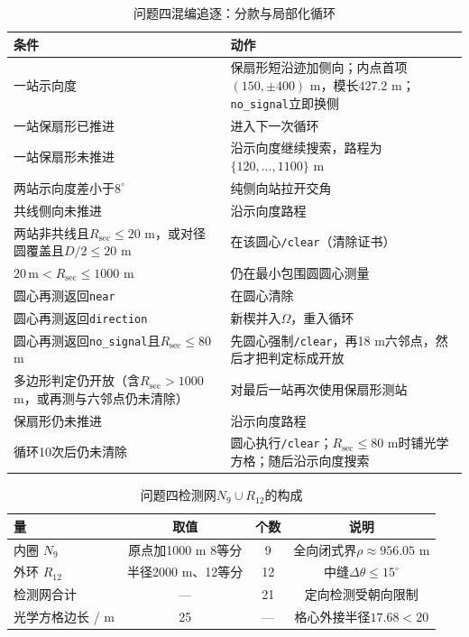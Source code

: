 \documentclass{cumcmthesis}
\begin{document}
\begin{table}[htbp]
\centering
\caption{问题四混编追逐：分款与局部化循环}
\label{tab:q4chase}
\begin{tabular}{>{\raggedright\arraybackslash}p{}>{\raggedright\arraybackslash}p{}}
\toprule
条件 & 动作 \\
\midrule
一站示向度 & 保扇形短沿迹加侧向；内点首项$(150,\pm 400)$ m，模长$427.2$ m；\texttt{no\_signal}立即换侧 \\
一站保扇形已推进 & 进入下一次循环 \\
一站保扇形未推进 & 沿示向度继续搜索，路程为$\{120,\ldots,1100\}$ m \\
两站示向度差小于$8^\circ$ & 纯侧向站拉开交角 \\
共线侧向未推进 & 沿示向度路程 \\
两站非共线且$R_{\mathrm{sec}}\le 20$ m，或对径圆覆盖且$D/2\le 20$ m & 在该圆心\texttt{/clear}（清除证书） \\
$20\,\mathrm{m}<R_{\mathrm{sec}}\le 1000$ m & 仍在最小包围圆圆心测量 \\
圆心再测返回\texttt{near} & 在圆心清除 \\
圆心再测返回\texttt{direction} & 新楔并入$\Omega$，重入循环 \\
圆心再测返回\texttt{no\_signal}且$R_{\mathrm{sec}}\le 80$ m & 先圆心强制\texttt{/clear}，再18 m六邻点，然后才把判定标成开放 \\
多边形判定仍开放（含$R_{\mathrm{sec}}>1000$ m，或再测与六邻点仍未清除） & 对最后一站再次使用保扇形测站 \\
保扇形仍未推进 & 沿示向度路程 \\
循环10次后仍未清除 & 圆心执行\texttt{/clear}；$R_{\mathrm{sec}}\le 80$ m时铺光学方格；随后沿示向度搜索 \\
\bottomrule
\end{tabular}
\end{table}

\begin{table}[htbp]
\centering
\caption{问题四检测网$N_9\cup R_{12}$的构成}
\label{tab:q4pts}
\begin{tabular}{lccc}
\toprule
量 & 取值 & 个数 & 说明 \\
\midrule
内圈 $N_9$ & 原点加1000 m 8等分 & 9 & 全向闭式界$\rho\approx 956.05$ m \\
外环 $R_{12}$ & 半径2000 m、12等分 & 12 & 中缝$\Delta\theta\le 15^\circ$ \\
检测网合计 & --- & 21 & 定向检测受朝向限制 \\
光学方格边长 / m & 25 & --- & 格心外接半径$17.68<20$ \\
\bottomrule
\end{tabular}
\end{table}
\end{document}
